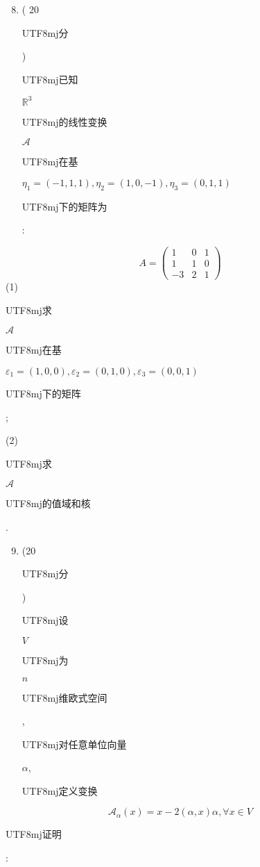 \documentclass[10pt]{article}
\begin{document}
\begin{enumerate}
  \setcounter{enumi}{7}
  \item ( 20 \begin{CJK}{UTF8}{mj}分\end{CJK}) \begin{CJK}{UTF8}{mj}已知\end{CJK} $\mathbb{R}^{3}$ \begin{CJK}{UTF8}{mj}的线性变换\end{CJK} $\mathscr{A}$ \begin{CJK}{UTF8}{mj}在基\end{CJK} $\eta_{1}=(-1,1,1), \eta_{2}=(1,0,-1), \eta_{3}=(0,1,1)$ \begin{CJK}{UTF8}{mj}下的矩阵为\end{CJK}:
\end{enumerate}
$$
A=\left(\begin{array}{ccc}
1 & 0 & 1 \\
1 & 1 & 0 \\
-3 & 2 & 1
\end{array}\right)
$$
(1) \begin{CJK}{UTF8}{mj}求\end{CJK} $\mathscr{A}$ \begin{CJK}{UTF8}{mj}在基\end{CJK} $\varepsilon_{1}=(1,0,0), \varepsilon_{2}=(0,1,0), \varepsilon_{3}=(0,0,1)$ \begin{CJK}{UTF8}{mj}下的矩阵\end{CJK};

(2) \begin{CJK}{UTF8}{mj}求\end{CJK} $\mathscr{A}$ \begin{CJK}{UTF8}{mj}的值域和核\end{CJK}.

\begin{enumerate}
  \setcounter{enumi}{8}
  \item (20 \begin{CJK}{UTF8}{mj}分\end{CJK}) \begin{CJK}{UTF8}{mj}设\end{CJK} $V$ \begin{CJK}{UTF8}{mj}为\end{CJK} $n$ \begin{CJK}{UTF8}{mj}维欧式空间\end{CJK}, \begin{CJK}{UTF8}{mj}对任意单位向量\end{CJK} $\alpha$, \begin{CJK}{UTF8}{mj}定义变换\end{CJK}
\end{enumerate}
$$
\mathscr{A}_{\alpha}(x)=x-2(\alpha, x) \alpha, \forall x \in V
$$
\begin{CJK}{UTF8}{mj}证明\end{CJK}:
\end{document}
